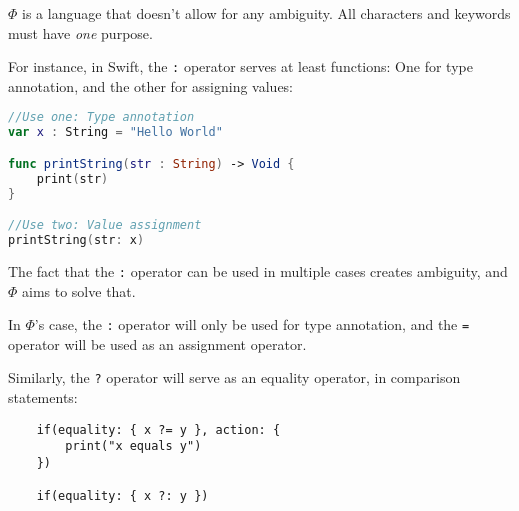\documentclass[../../main.tex]{subfiles}
\begin{document}
$\Phi$ is a language that doesn't allow for any ambiguity. All characters and keywords must have \textit{one} purpose.

For instance, in Swift, the \texttt{:} operator serves at least functions: One for type annotation, and the other for assigning values:

\begin{lstlisting}[language=swift]
//Use one: Type annotation
var x : String = "Hello World"

func printString(str : String) -> Void {
    print(str)
}

//Use two: Value assignment
printString(str: x)
\end{lstlisting}

The fact that the \texttt{:} operator can be used in multiple cases creates ambiguity, and $\Phi$ aims to solve that.

In $\Phi$'s case, the \texttt{:} operator will only be used for type annotation, and the \texttt{=} operator will be used as an assignment operator.

Similarly, the \texttt{?} operator will serve as an equality operator, in comparison statements:

\begin{verbatim}
    if(equality: { x ?= y }, action: {
        print("x equals y")
    })

    if(equality: { x ?: y })
\end{verbatim}
\end{document}
